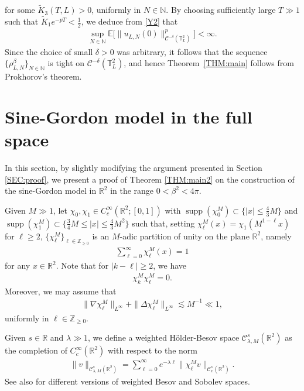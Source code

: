 \documentclass[letterpaper, 11pt,  reqno]{amsart}
\theoremstyle{myremark}
\DeclareMathOperator*{\supp}{supp}
\newcommand{\1}{\hspace{0.5mm}\text{I}\hspace{0.5mm}}
\newcommand{\Z}{\mathbb{Z}}
\newcommand{\R}{\mathbb{R}}
\newcommand{\C}{\mathbb{C}}
\newcommand{\T}{\mathbb{T}}
\newcommand{\CC}{\mathcal{C}}
\newcommand{\E}{\mathbb{E}}
\newcommand{\be}{\beta}
\newcommand{\dl}{\delta}
\newcommand{\nb}{\nabla}
\newcommand{\Dl}{\Delta}
\newcommand{\ld}{\lambda}
\newcommand{\wt}{\widetilde}
\renewcommand{\l}{\ell}
\newcommand{\les}{\lesssim}
\newcommand{\N}{\mathbb{N}}
\renewcommand{\C}{\mathcal{C}}
\numberwithin{equation}{section}
\numberwithin{theorem}{section}
\begin{document}
for some $\wt K_3(T,L) > 0$,
uniformly in $N \in \N$.
By choosing sufficiently large $T \gg 1$
such  that $\wt K_1 e^{-pT} < \frac12$, we deduce from \eqref{Y2} that 
\begin{align*}
\sup_{N \in \N} \E \big[ \| u_{L, N}(0) \|_{\CC^{-\dl}(\T^2_L)}^p \big]  < \infty.
\end{align*}
Since the choice of small $\delta>0$ was arbitrary, it follows that the sequence $\{\rho_{L, N}^\be\}_{N \in \N}$
is tight on $\CC^{-\dl}(\T_L^2)$, 
and hence  Theorem~\ref{THM:main} follows from Prokhorov's theorem.










\section{Sine-Gordon model in the full space}
\label{SEC:R2}

In this section, 
by slightly modifying the argument presented in Section 
\ref{SEC:proof}, we present a proof of 
Theorem \ref{THM:main2}
on the construction of 
 the sine-Gordon model in $\R^2$ in the range $0 < \be^2 < 4\pi$. 




Given $M \gg1$, 
let $\chi_0, \chi_1 \in C^{\infty}_c(\R^2; [0, 1])$ with 
$\supp (\chi^M_0) \subset \big\{|x|\le \tfrac{4}{3}M\big\}$ and $
\supp (\chi^M_1) \subset \big\{\tfrac{3}{4}M \le |x|\le \tfrac{4}{3}M^2\big\}$ 
such that, setting  $\chi^M_\l(x) = \chi_1(M^{1-\l} x)$ for $\l \ge 2$, 
$\{\chi^M_\l\}_{\l \in \Z_{\ge 0}}$ is an 
 $M$-adic partition of unity on the plane $\R^2$, namely
\begin{align}
\sum_{\l = 0}^\infty \chi^M_\l(x) =  1
\label{A0}
\end{align}
for any $x \in \R^2$.
Note that for $|k-\l| \ge 2$, 
we have 
\begin{align}
\chi^M_k \chi^M_\l = 0.
\label{A1}
\end{align}
Moreover,  we may assume that 
\begin{align}
\|\nb \chi^M_\l \|_{L^\infty}
+ 
\|\Dl \chi^M_\l \|_{L^\infty}    \les M^{-1} \ll 1, 
\label{A2}
\end{align}
uniformly in $\l \in \Z_{\ge 0}$.


Given $s \in \R$ and $\ld \gg 1$, 
we define a weighted H\"older-Besov space $\C^s_{\ld, M}(\R^2)$
as the completion of $C^\infty_c(\R^2)$
with respect to the norm
\begin{align}
\|v\|_{\C^s_{\ld, M}(\R^2)} = \sum_{\l =  0}^\infty e^{-\ld \l} \|\chi^M_\l v\|_{\CC_x^s(\R^2)}.
\label{A3}
\end{align}
See also \cite{MW2, OTWZ}
for different versions of weighted Besov and Sobolev spaces.
\end{document}
